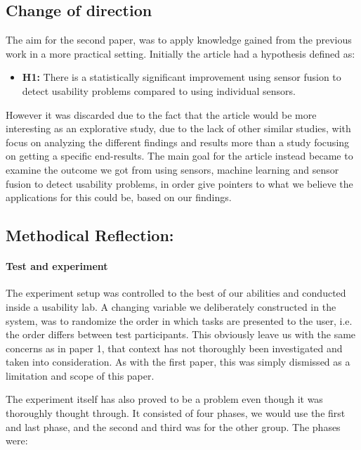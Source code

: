 \subsection{Change of direction}
The aim for the second paper, was to apply knowledge gained from the previous work in a more practical setting. 
Initially the article had a hypothesis defined as:
\begin{itemize}
    \item \textbf{H1:} There is a statistically significant improvement using sensor fusion to detect usability problems compared to using individual sensors.
\end{itemize}
However it was discarded due to the fact that the article would be more interesting as an explorative study, due to the lack of other similar studies, with focus on analyzing the different findings and results more than a study focusing on getting a specific end-results.
The main goal for the article instead became to examine the outcome we got from using sensors, machine learning and sensor fusion to detect usability problems,
in order give pointers to what we believe the applications for this could be, based on our findings.

\subsection{Methodical Reflection:}
\paragraph{Test and experiment}
The experiment setup was controlled to the best of our abilities and conducted inside a usability lab. A changing
variable we deliberately constructed in the system, was to randomize the order in which tasks are presented to the user,
i.e. the order differs between test participants.
This obviously leave us with the same concerns as in paper 1, that context has not thoroughly been investigated and taken
into consideration. As with the first paper, this was simply dismissed as a limitation and scope of this paper.

The experiment itself has also proved to be a problem even though it was thoroughly thought through.
It consisted of four phases, we would use the first and last phase, and the second and third was for the other group. The phases were:

